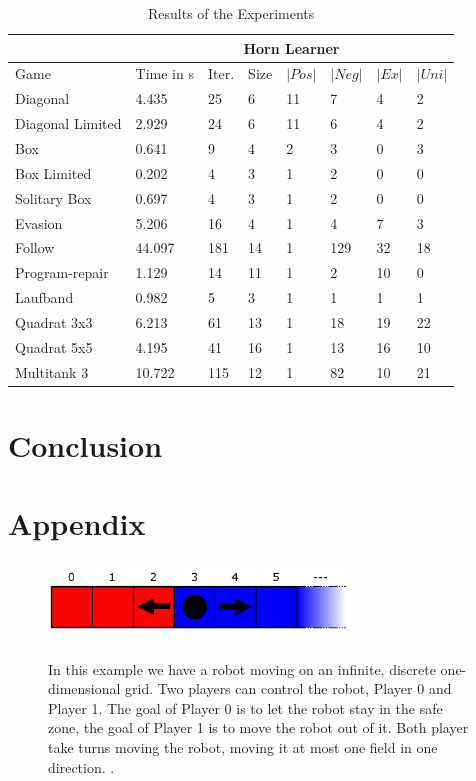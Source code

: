 \documentclass[10pt,a4paper]{article}
\theoremstyle{plain}
\theoremstyle{definition}
\begin{document}
\begin{table}[h]
 \caption{Results of the Experiments}
\begin{tabularx}{\textwidth}{p{}p{} p{} p{}p{} p{} p{} p{}}
\hline
& \multicolumn{7}{c}{Horn Learner}\\ \hline
Game & Time in s & Iter.& Size & $|Pos|$ & $|Neg|$ & $|Ex|$ & $|Uni|$ \\ \hline
Diagonal & 4.435 & 25 & 6 & 11 & 7 & 4 & 2 \\ 
Diagonal Limited & 2.929 & 24 & 6 & 11 & 6 & 4 & 2 \\ 
Box & 0.641 & 9 & 4 & 2 & 3 & 0 & 3 \\
Box Limited & 0.202 & 4 & 3 & 1 & 2 & 0 & 0 \\
Solitary Box & 0.697 & 4 & 3 & 1 & 2 & 0 & 0 \\
Evasion & 5.206 & 16 & 4 & 1 & 4 & 7 & 3 \\ 
Follow & 44.097 & 181 & 14 & 1 & 129 & 32 & 18 \\ 
Program-repair & 1.129 & 14 & 11 & 1 & 2 & 10 & 0 \\
Laufband & 0.982 & 5 & 3 & 1 & 1 & 1 & 1 \\ 
Quadrat 3x3 & 6.213 & 61 & 13 & 1 & 18 & 19 & 22 \\
Quadrat 5x5 & 4.195 & 41 & 16 & 1 & 13 & 16 & 10 \\
Multitank 3 & 10.722 & 115& 12 & 1 & 82 & 10 & 21 \\

\end{tabularx}
 \label{tab:TESTS} 
\end{table}
\newpage

\section{Conclusion}
\newpage


\newpage
\appendix
\section{Appendix}
\begin{figure}[h] \label{Laufband}
  \caption{In this example we have a robot moving on an infinite, discrete one-dimensional grid. Two players can control the robot, Player 0 and Player 1. The goal of Player 0 is to let the robot stay in the safe zone, the goal of Player 1 is to move the robot out of it. Both player take turns moving the robot, moving it at most one field in one direction.
.}
  \centering
    {\includegraphics[width=8.0cm]{laufband.png}} 

\end{figure}
\end{document}
